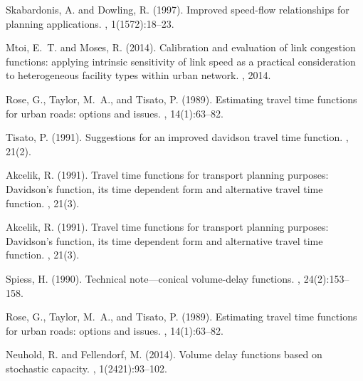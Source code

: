 \documentclass{CUP-JNL-DCE}
\begin{document}
\begin{Backmatter}
\begin{thebibliography}{}
Skabardonis, A. and Dowling, R. (1997).
\newblock Improved speed-flow relationships for planning applications.
, 1(1572):18--23.

Mtoi, E.~T. and Moses, R. (2014).
\newblock Calibration and evaluation of link congestion functions: applying
intrinsic sensitivity of link speed as a practical consideration to
heterogeneous facility types within urban network.
, 2014.

Rose, G., Taylor, M.~A., and Tisato, P. (1989).
\newblock Estimating travel time functions for urban roads: options and issues.
, 14(1):63--82.

Tisato, P. (1991).
\newblock Suggestions for an improved davidson travel time function.
, 21(2).

Akcelik, R. (1991).
\newblock Travel time functions for transport planning purposes: Davidson's
function, its time dependent form and alternative travel time function.
, 21(3).

Akcelik, R. (1991).
\newblock Travel time functions for transport planning purposes: Davidson's
function, its time dependent form and alternative travel time function.
, 21(3).

Spiess, H. (1990).
\newblock Technical note—conical volume-delay functions.
, 24(2):153--158.

Rose, G., Taylor, M.~A., and Tisato, P. (1989).
\newblock Estimating travel time functions for urban roads: options and issues.
, 14(1):63--82.

Neuhold, R. and Fellendorf, M. (2014).
\newblock Volume delay functions based on stochastic capacity.
, 1(2421):93--102.


\end{thebibliography}
\end{Backmatter}
\end{document}
